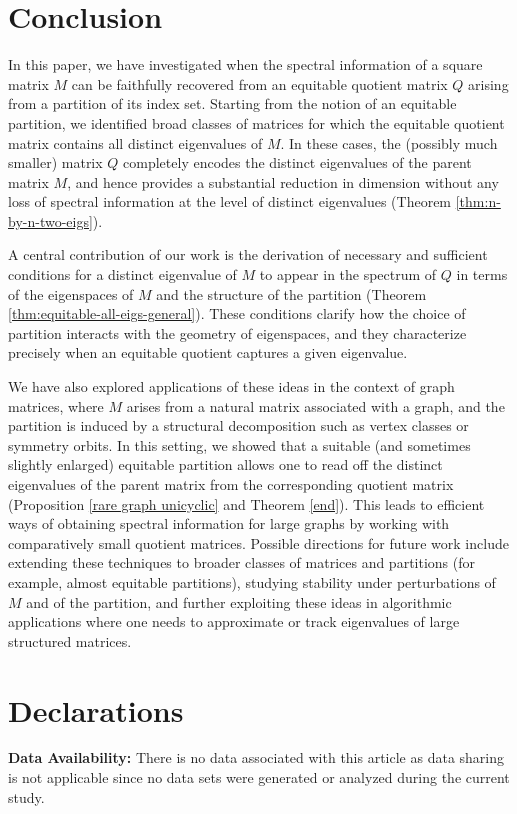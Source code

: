 \documentclass[12pt,twoside]{article}
\begin{document}
\section{Conclusion}

In this paper, we have investigated when the spectral information of a square matrix $M$ can be faithfully recovered from an equitable quotient matrix $Q$ arising from a partition of its index set. Starting from the notion of an equitable partition, we identified broad classes of matrices for which the equitable quotient matrix contains all distinct eigenvalues of $M$. In these cases, the (possibly much smaller) matrix $Q$ completely encodes the distinct eigenvalues of the parent matrix $M$, and hence provides a substantial reduction in dimension without any loss of spectral information at the level of distinct eigenvalues (Theorem \ref{thm:n-by-n-two-eigs}).

A central contribution of our work is the derivation of necessary and sufficient conditions for a distinct eigenvalue of $M$ to appear in the spectrum of $Q$ in terms of the eigenspaces of $M$ and the structure of the partition (Theorem \ref{thm:equitable-all-eigs-general}). These conditions clarify how the choice of partition interacts with the geometry of eigenspaces, and they characterize precisely when an equitable quotient captures a given eigenvalue. 

We have also explored applications of these ideas in the context of graph matrices, where $M$ arises from a natural matrix associated with a graph, and the partition is induced by a structural decomposition such as vertex classes or symmetry orbits. In this setting, we showed that a suitable (and sometimes slightly enlarged) equitable partition allows one to read off the distinct eigenvalues of the parent matrix from the corresponding quotient matrix (Proposition \ref{rare graph unicyclic} and Theorem \ref{end}). This leads to efficient ways of obtaining spectral information for large graphs by working with comparatively small quotient matrices.   Possible directions for future work include extending these techniques to broader classes of matrices and partitions (for example, almost equitable partitions), studying stability under perturbations of $M$ and of the partition, and further exploiting these ideas in algorithmic applications where one needs to approximate or track eigenvalues of large structured matrices.

\section*{Declarations}
\noindent \textbf{Data Availability:}	There is no data associated with this article as data sharing is not applicable since no data sets were generated or analyzed during the current study.
\end{document}
